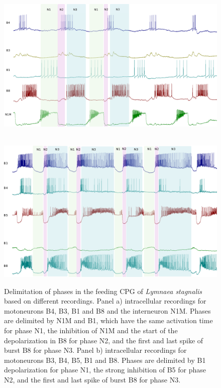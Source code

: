 \begin{figure}[bth!]
	\centering
	\begin{minipage}[b]{0.9\textwidth}
		\\
		\centering
		\includegraphics[width=\textwidth]{img/invariants/example_phases_1.pdf}
	\end{minipage}
	\vspace{20pt}
	\begin{minipage}[b]{0.9\textwidth}
		\\
		\centering
		\includegraphics[width=\textwidth]{img/invariants/example_phases_2.pdf}
	\end{minipage}
	\caption{Delimitation of phases in the feeding CPG of \textit{Lymnaea stagnalis} based on different recordings. Panel a) intracellular recordings for motoneurons B4, B3, B1 and B8 and the interneuron N1M. Phases are delimited by N1M and B1, which have the same activation time for phase N1, the inhibition of N1M and the start of the depolarization in B8 for phase N2, and the first and last spike of burst B8 for phase N3. Panel b) intracellular recordings for motoneurons B3, B4, B5, B1 and B8. Phases are delimited by B1 depolarization for phase N1, the strong inhibition of B5 for phase N2, and the first and last spike of burst B8 for phase N3.}
	\label{fig:example lymnaea phases recording}
\end{figure}

